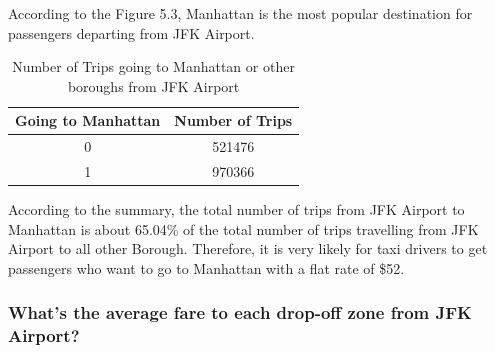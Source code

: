 \documentclass[12pt,twoside]{reedthesis}
\theoremstyle{definition}
\theoremstyle{definition}
\theoremstyle{definition}
\theoremstyle{remark}
\begin{document}
According to the Figure 5.3, Manhattan is the most popular destination
for passengers departing from JFK Airport.
\begin{table}

\caption{\label{tab:unnamed-chunk-105}Number of Trips going to Manhattan or other boroughs from JFK Airport}
\centering
\begin{tabular}[t]{cc}
\toprule
Going to Manhattan & Number of Trips\\
\midrule
0 & 521476\\
1 & 970366\\
\bottomrule
\end{tabular}
\end{table}
According to the summary, the total number of trips from JFK Airport to
Manhattan is about 65.04\% of the total number of trips travelling from
JFK Airport to all other Borough. Therefore, it is very likely for taxi
drivers to get passengers who want to go to Manhattan with a flat rate
of \$52.

\subsubsection{What's the average fare to each drop-off zone from JFK
Airport?}\label{whats-the-average-fare-to-each-drop-off-zone-from-jfk-airport}
\end{document}
